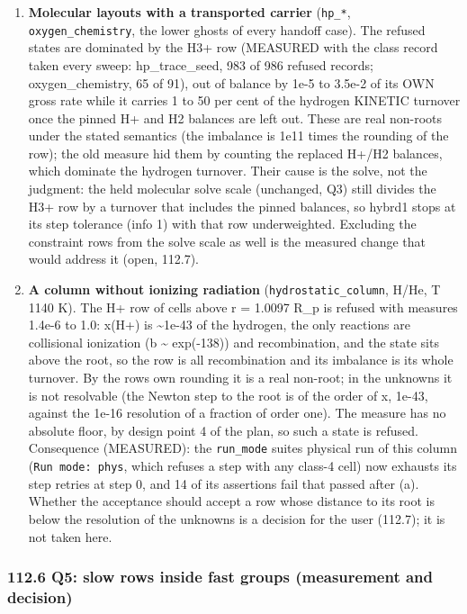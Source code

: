 \documentclass[english,a4paper]{my_memo}
\providecommand{\tightlist}{\setlength{\itemsep}{0pt}\setlength{\parskip}{0pt}}
\begin{document}
\begin{enumerate}
\def\labelenumi{\arabic{enumi}.}
\tightlist
\item
  \textbf{Molecular layouts with a transported carrier} (\texttt{hp\_*},
  \texttt{oxygen\_chemistry}, the lower ghosts of every handoff case). The refused
  states are dominated by the H3+ row (MEASURED with the class record taken
  every sweep: hp\_trace\_seed, 983 of 986 refused records; oxygen\_chemistry,
  65 of 91), out of balance by 1e-5 to 3.5e-2 of its OWN gross rate while it
  carries 1 to 50 per cent of the hydrogen KINETIC turnover once the pinned
  H+ and H2 balances are left out. These are real non-roots under the stated
  semantics (the imbalance is 1e11 times the rounding of the row); the old
  measure hid them by counting the replaced H+/H2 balances, which dominate
  the hydrogen turnover. Their cause is the solve, not the judgment: the held
  molecular solve scale (unchanged, Q3) still divides the H3+ row by a
  turnover that includes the pinned balances, so hybrd1 stops at its step
  tolerance (info 1) with that row underweighted. Excluding the constraint
  rows from the solve scale as well is the measured change that would
  address it (open, 112.7).
\item
  \textbf{A column without ionizing radiation} (\texttt{hydrostatic\_column}, H/He,
  T 1140 K). The H+ row of cells above r = 1.0097 R\_p is refused with
  measures 1.4e-6 to 1.0: x(H+) is \textasciitilde1e-43 of the hydrogen, the only reactions
  are collisional ionization (b \textasciitilde{} exp(-138)) and recombination, and the
  state sits above the root, so the row is all recombination and its imbalance
  is its whole turnover. By the row\textquotesingle s own rounding it is a real non-root; in
  the unknowns it is not resolvable (the Newton step to the root is of the
  order of x, 1e-43, against the 1e-16 resolution of a fraction of order
  one). The measure has no absolute floor, by design point 4 of the plan, so
  such a state is refused. Consequence (MEASURED): the \texttt{run\_mode} suite\textquotesingle s
  physical run of this column (\texttt{Run\ mode:\ phys}, which refuses a step with any
  class-4 cell) now exhausts its step retries at step 0, and 14 of its
  assertions fail that passed after (a). Whether the acceptance should accept
  a row whose distance to its root is below the resolution of the unknowns is
  a decision for the user (112.7); it is not taken here.
\end{enumerate}

\subsubsection{112.6 Q5: slow rows inside fast groups (measurement and decision)}\label{1126-q5-slow-rows-inside-fast-groups-measurement-and-decision}
\end{document}
